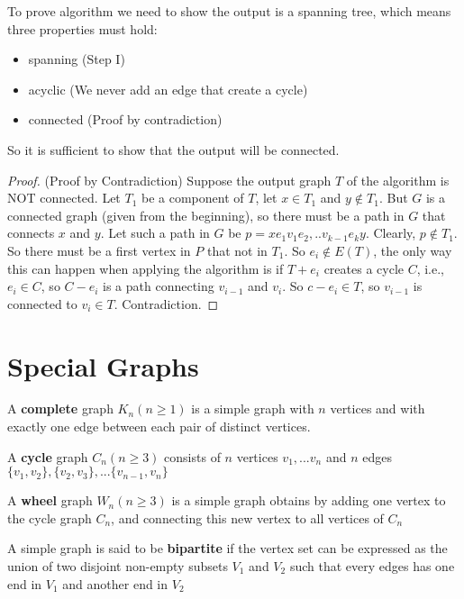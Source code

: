 			To prove algorithm we need to show the output is a spanning tree, which means three properties must hold:
			\begin{itemize}
				\item spanning (Step I)
				\item acyclic (We never add an edge that create a cycle)
				\item connected (Proof by contradiction)
			\end{itemize}
			So it is sufficient to show that the output will be connected.
			\begin{proof}
				(Proof by Contradiction) Suppose the output graph $T$ of the algorithm is NOT connected. Let $T_1$ be a component of $T$, let $x\in T_1$ and $y \notin T_1$. But $G$ is a connected graph (given from the beginning), so there must be a path in $G$ that connects $x$ and $y$. Let such a path in $G$ be $p=xe_1v_1e_2,..v_{k-1}e_ky$. Clearly, $p\notin T_1$. So there must be a first vertex in $P$ that not in $T_1$. So $e_i \notin E(T)$, the only way this can happen when applying the algorithm is if $T + e_i$ creates a cycle $C$, i.e., $e_i \in C$, so $C - e_i$ is a path connecting $v_{i-1}$ and $v_i$. So $c - e_i \in T$, so $v_{i-1}$ is connected to $v_i \in T$. Contradiction. 
			\end{proof}

		\section{Special Graphs}
			\begin{definition}
				A \textbf{complete} graph $K_n (n \ge 1)$ is a simple graph with $n$ vertices and with exactly one edge between each pair of distinct vertices.
			\end{definition}

			\begin{definition}
				A \textbf{cycle} graph $C_n (n \ge 3)$ consists of $n$ vertices $v_1, ... v_n$ and $n$ edges $\{v_1, v_2\}, \{v_2, v_3\}, ... \{v_{n-1}, v_n\}$
			\end{definition}

			\begin{definition}
				A \textbf{wheel} graph $W_n (n \ge 3)$ is a simple graph obtains by adding one vertex to the cycle graph $C_n$, and connecting this new vertex to all vertices of $C_n$ 
			\end{definition}

			\begin{definition}
				A simple graph is said to be \textbf{bipartite} if the vertex set can be expressed as the union of two disjoint non-empty subsets $V_1$ and $V_2$ such that every edges has one end in $V_1$ and another end in $V_2$
			\end{definition}

